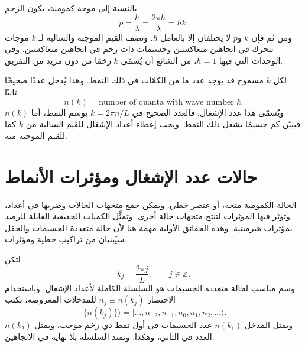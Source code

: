 بالنسبة إلى موجة كمومية، يكون الزخم
\begin{equation}
p=\frac{h}{\lambda}
=\frac{2\pi\hbar}{\lambda}
=\hbar k.
\end{equation}
ومن ثم فإن \(k\) و\(p\) لا يختلفان إلا بالعامل \(\hbar\). وتصف القيم الموجبة والسالبة لـ \(k\) موجات تتحرك في اتجاهين متعاكسين وجسيمات ذات زخم في اتجاهين متعاكسين. وفي الوحدات التي فيها \(\hbar=1\)، من الشائع أن يُسمّى \(k\) زخمًا من دون مزيد من التفريق.

لكل \(k\) مسموح قد يوجد عدد ما من الكمّات في ذلك النمط. وهذا يُدخل عددًا صحيحًا ثانيًا:
\begin{equation}
n(k)=\text{number of quanta with wave number }k.
\end{equation}
ويُسمّى هذا عدد الإشغال. فالعدد الصحيح في \(k=2\pi n/L\) يوسم النمط، أما \(n(k)\) فيبيّن كم جسيمًا يشغل ذلك النمط. ويجب إعطاء أعداد الإشغال للقيم السالبة من \(k\) كما للقيم الموجبة منه.

\begin{classroomqa}
\end{classroomqa}

\section{حالات عدد الإشغال ومؤثرات الأنماط}

الحالة الكمومية متجه، أو عنصر خطي. ويمكن جمع متجهات الحالات وضربها في أعداد، وتؤثر فيها المؤثرات لتنتج متجهات حالة أخرى. وتمثَّل الكميات الحقيقية القابلة للرصد بمؤثرات هيرميتية. وهذه الحقائق الأولية مهمة هنا لأن حالة متعددة الجسيمات والحقل سيُبنيان من تراكيب خطية ومؤثرات.

لتكن
\begin{equation}
k_j=\frac{2\pi j}{L},
\qquad j\in\mathbb Z.
\end{equation}
وسم مناسب لحالة متعددة الجسيمات هو السلسلة الكاملة لأعداد الإشغال. وباستخدام الاختصار \(n_j\equiv n(k_j)\) للمدخلات المعروضة، نكتب
\begin{equation}
\big|\{n(k_j)\}\big\rangle
=
\big|\ldots,n_{-2},n_{-1},n_0,n_1,n_2,\ldots\big\rangle.
\end{equation}
ويمثل المدخل \(n(k_1)\) عدد الجسيمات في أول نمط ذي زخم موجب، ويمثل \(n(k_2)\) العدد في الثاني، وهكذا. وتمتد السلسلة بلا نهاية في الاتجاهين.

